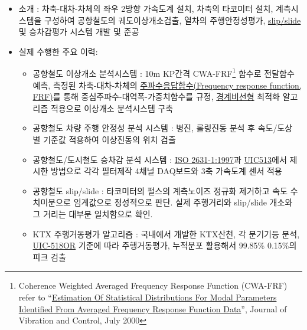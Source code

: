 \documentclass[10pt,a4paper,ragged2e]{altacv}
\begin{document}
\begin{fullwidth}
\divider


\begin{itemize}
\item 소개 : 차축-대차-차체의 좌우 2방향 가속도계 설치, 차축의 타코미터 설치, 계측시스템을 구성하여 공항철도의 궤도이상개소검출, 열차의 주행안정성평가, \href{http://ieeexplore.ieee.org/xpl/login.jsp?tp=\&arnumber=264942\&url=http\%3A\%2F\%2Fieeexplore.ieee.org\%2Fxpls\%2Fabs_all.jsp\%3Farnumber\%3D264942}{slip/slide} 및 승차감평가 시스템 개발 및 준공
\item 실제 수행한 주요 이력: 
\begin{itemize}
  \item 공항철도 이상개소 분석시스템 : 10m KP간격 CWA-FRF\footnote{Coherence Weighted Averaged Frequency Response Function (CWA-FRF) refer to ``\href{http://institute.lanl.gov/ei/shm/pubs/modal_stat_jvc_jul00.pdf}{Estimation Of Statistical Distributions For Modal Parameters Identified From Averaged Frequency Response Function Data}'', Journal of Vibration and Control, July 2000} 함수로 전달함수 예측, 측정된 차축-대차-차체의 \href{https://en.wikipedia.org/wiki/Frequency_response}{주파수응답함수(Frequency response function, FRF)}를 통해 중심주파수-대역폭-가중치함수를 규정, \href{http://www.scholarpedia.org/article/Boundary_value_problem}{경계비선형} 최적화 알고리즘 적용으로 이상개소 분석시스템 구축 
  \item 공항철도 차량 주행 안정성 분석 시스템 : 병진, 롤링진동 분석 후 속도/도상 별 기준값 적용하여 이상진동의 위치 검출
  \item 공항철도/도시철도 승차감 분석 시스템 : \href{http://www.iso.org/iso/catalogue_detail.htm?csnumber=7612}{ISO 2631-1:1997}과 \href{http://www.uic.org/etf/codex/codex-detail.php?codeFiche=513\&langue_fiche=E}{UIC513}에서 제시한 방법으로 각각 필터제작 4채널 DAQ보드와 3축 가속도계 센서 적용 
  \item 공항철도 slip/slide : 타코미터의 펄스의 계측노이즈 정규화 제거하고 속도 수치미분으로 임계값으로 정성적으로 판단. 실제 주행거리와 slip/slide 개소와 그 거리는 대부분 일치함으로 확인.
  \item KTX 주행거동평가 알고리즘 : 국내에서 개발한 KTX산천, 각 분기기등 분석, \href{http://www.uic.org/etf/codex/codex-detail.php?langue_fiche=E\&codeFiche=518}{UIC-518OR} 기준에 따라 주행거동평가, 누적분포 활용해서 99.85\% 0.15\%의 피크 검출
\end{itemize}

\end{itemize}
\end{fullwidth}
\end{document}
